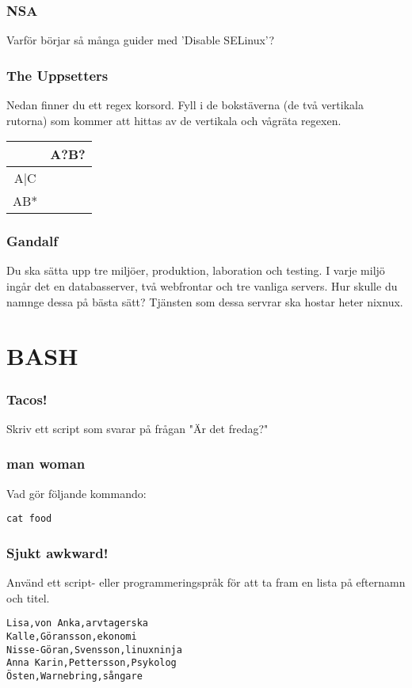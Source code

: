 \documentclass[a4paper]{report}
\begin{document}
\subsubsection{NSA}
Varför börjar så många guider med 'Disable SELinux'?

\subsubsection{The Uppsetters}
Nedan finner du ett regex korsord. Fyll i de bokstäverna (de två vertikala rutorna) som kommer att hittas av de vertikala och vågräta regexen.
\newline
\begin{tabular}{| c | c |}
\hline
& A?B? \\ \hline
A|C & \\ \hline
AB* & \\ \hline
\end{tabular}

\subsubsection{Gandalf}
Du ska sätta upp tre miljöer, produktion, laboration och testing. I varje miljö ingår det en databasserver, två webfrontar och tre vanliga servers. 
Hur skulle du namnge dessa på bästa sätt?
Tjänsten som dessa servrar ska hostar heter nixnux.

\section{BASH}

\subsubsection{Tacos!}
Skriv ett script som svarar på frågan "Är det fredag?"

\subsubsection{man woman}
Vad gör följande kommando:
\begin{verbatim}
cat food
\end{verbatim}

\subsubsection{Sjukt awkward!}
Använd ett script- eller programmeringspråk för att ta fram en lista på efternamn och titel.
\begin{verbatim}
Lisa,von Anka,arvtagerska
Kalle,Göransson,ekonomi
Nisse-Göran,Svensson,linuxninja
Anna Karin,Pettersson,Psykolog
Östen,Warnebring,sångare
\end{verbatim}
\end{document}
